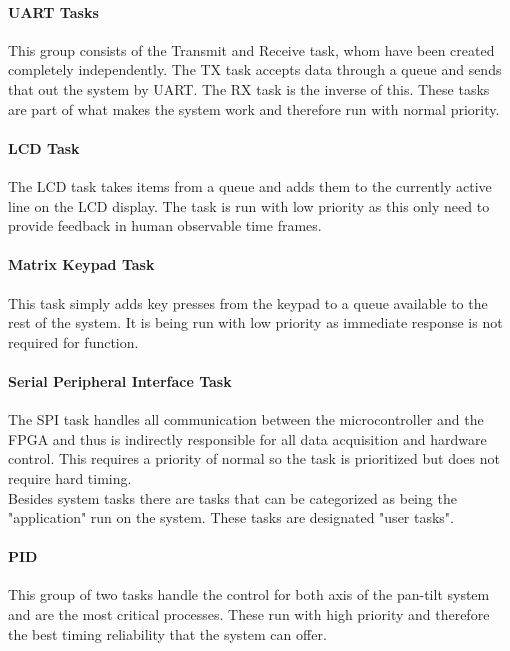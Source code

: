 \documentclass[../../../main]{subfiles}
\begin{document}
\paragraph{UART Tasks}%

This group consists of the Transmit and Receive task, whom have been created completely independently. The TX task accepts data through a queue and sends that out the system by UART. The RX task is the inverse of this. These tasks are part of what makes the system work and therefore run with normal priority.

\paragraph{LCD Task}

The LCD task takes items from a queue and adds them to the currently active line on the LCD display. The task is run with low  priority as this only need to provide feedback in human observable time frames.

\paragraph{Matrix Keypad Task}

This task simply adds key presses from the keypad to a queue available to the rest of the system. It is being run with low priority as immediate response is not required for function.

\paragraph{Serial Peripheral Interface Task}

The SPI task handles all communication between the microcontroller and the FPGA and thus is indirectly responsible for all data acquisition and hardware control. This requires a priority of normal so the task is prioritized but does not require hard timing.\\

Besides system tasks there are tasks that can be categorized as being the "application" run on the system. These tasks are designated "user tasks".

\paragraph{PID}

This group of two tasks handle the control for both axis of the pan-tilt system and are the most critical processes. These run with high priority and therefore the best timing reliability that the system can offer.
\end{document}
